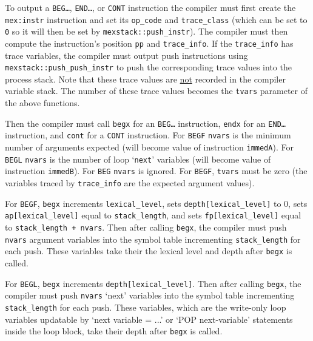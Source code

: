 \documentclass[12pt]{article}
\begin{document}
\begin{indpar}
To output a {\tt BEG\ldots}, {\tt END\ldots}, or {\tt CONT} instruction
the compiler must first create the {\tt mex:instr} instruction and set
its {\tt op\_code} and {\tt trace\_class} (which can be set to {\tt 0}
so it will then be set by {\tt mexstack::push\_instr}).  The compiler must then
compute the instruction's position {\tt pp} and {\tt trace\_info}.
If the {\tt trace\_info} has
trace variables, the
compiler must output push instructions using
{\tt mexstack::\EOL push\_\EOL push\_\EOL instr}
to push the corresponding trace values into the process stack.
Note that these trace values are \underline{not} recorded in the
compiler variable stack.  The number of these trace values becomes
the {\tt tvars} parameter of the above functions.

Then the compiler must call {\tt begx} for an {\tt BEG\ldots} instruction,
{\tt endx} for an {\tt END\ldots} instruction, and {\tt cont} for
a {\tt CONT} instruction.  For {\tt BEGF} {\tt nvars} is the minimum number
of arguments expected (will become value of instruction {\tt immedA}).
For {\tt BEGL} {\tt nvars} is the number of loop `{\tt next}' variables
(will become value of instruction {\tt immedB}).  For {\tt BEG} {\tt nvars}
is ignored.  For {\tt BEGF}, {\tt tvars} must be zero (the variables traced
by {\tt trace\_info} are the expected argument values).

For {\tt BEGF}, {\tt begx} increments {\tt lexical\_level},
sets {\tt depth[lexical\_level]} to 0,
sets {\tt ap[lexical\_level]} equal to {\tt stack\_length},
and sets {\tt fp[lexical\_level]} equal to {\tt stack\_length + nvars}.
Then after calling {\tt begx}, the compiler
must push {\tt nvars} argument variables into the symbol table
incrementing {\tt stack\_length} for each push.  These variables
take their the lexical level and depth after {\tt begx} is called.

For {\tt BEGL}, {\tt begx} increments {\tt depth[lexical\_level]}.
Then after calling {\tt begx}, the compiler
must push {\tt nvars} `next' variables into the symbol table
incrementing {\tt stack\_\EOL length} for each push.  These variables,
which are the write-only loop variables updatable by `next variable = ...'
or `POP next-variable' statements inside the loop block,
take their depth after {\tt begx} is called.


\end{indpar}
\end{document}
